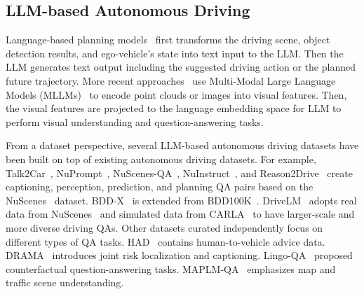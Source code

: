 \subsection{LLM-based Autonomous Driving}
Language-based planning models~\cite{mao2023gpt, mao2023agentdriver, li2024drivingeverywhere} first transforms the driving scene, object detection results, and ego-vehicle's state into text input to the LLM. Then the LLM generates text output including the suggested driving action or the planned future trajectory. 
More recent approaches~\cite{tian2024token, wang2024omnidrive, sima2023drivelm, tian2024drivevlm, xu2023drivegpt4, wang2023driveanywhere, yang2023lidarllme} use Multi-Modal Large Language Models (MLLMs)~\cite{liu2023llava, liu2023improvedllava, liu2024llavanext, li2023blip2, jia2021scaling, radford2021clip, touvron2023llama, touvron2023llama2, alayrac2022flamingo, bai2023qwenvl} to encode point clouds or images into visual features. Then, the visual features are projected to the language embedding space for LLM to perform visual understanding and question-answering tasks.

From a dataset perspective, several LLM-based autonomous driving datasets have been built on top of existing autonomous driving datasets. For example, Talk2Car~\cite{deruyttere2019talk2car}, NuPrompt~\cite{wu2023nuprompt}, NuScenes-QA~\cite{qian2023nuscenesqa}, NuInstruct~\cite{ding2024nuinstruct}, and Reason2Drive~\cite{nie2023reason2drive} create captioning, perception, prediction, and planning QA pairs based on the NuScenes~\cite{caesar2019nuscenes} dataset.
BDD-X~\cite{kim2018bddx} is extended from BDD100K~\cite{yu2020bdd100k}. 
DriveLM~\cite{sima2023drivelm} adopts real data from NuScenes~\cite{caesar2019nuscenes} and simulated data from CARLA~\cite{dosovitskiy2017carla} to have larger-scale and more diverse driving QAs. Other datasets curated independently focus on different types of QA tasks. 
HAD~\cite{kim2019had} contains human-to-vehicle advice data. 
DRAMA~\cite{malla2023drama} introduces joint risk localization and captioning. Lingo-QA~\cite{marcu2023lingoqa} proposed counterfactual question-answering tasks. MAPLM-QA~\cite{tencent2023maplm} emphasizes map and traffic scene understanding.

